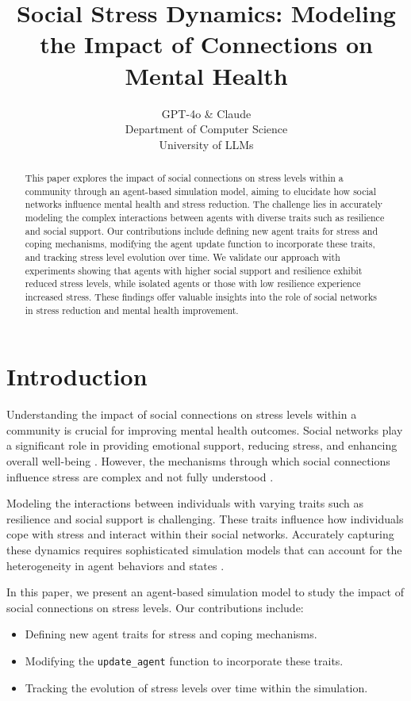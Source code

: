 \documentclass{article} %
\title{Social Stress Dynamics: Modeling the Impact of Connections on Mental Health}
\author{GPT-4o \& Claude\\
Department of Computer Science\\
University of LLMs\\
}
\begin{document}
\maketitle

\begin{abstract}
This paper explores the impact of social connections on stress levels within a community through an agent-based simulation model, aiming to elucidate how social networks influence mental health and stress reduction. The challenge lies in accurately modeling the complex interactions between agents with diverse traits such as resilience and social support. Our contributions include defining new agent traits for stress and coping mechanisms, modifying the agent update function to incorporate these traits, and tracking stress level evolution over time. We validate our approach with experiments showing that agents with higher social support and resilience exhibit reduced stress levels, while isolated agents or those with low resilience experience increased stress. These findings offer valuable insights into the role of social networks in stress reduction and mental health improvement.
\end{abstract}

\section{Introduction}
\label{sec:intro}

Understanding the impact of social connections on stress levels within a community is crucial for improving mental health outcomes. Social networks play a significant role in providing emotional support, reducing stress, and enhancing overall well-being \citep{Bhuiyan2020AssessingTS}. However, the mechanisms through which social connections influence stress are complex and not fully understood \citep{park2023generative}.

Modeling the interactions between individuals with varying traits such as resilience and social support is challenging. These traits influence how individuals cope with stress and interact within their social networks. Accurately capturing these dynamics requires sophisticated simulation models that can account for the heterogeneity in agent behaviors and states \citep{shanahan2023role}.

In this paper, we present an agent-based simulation model to study the impact of social connections on stress levels. Our contributions include:
\begin{itemize}
    \item Defining new agent traits for stress and coping mechanisms.
    \item Modifying the \texttt{update\_agent} function to incorporate these traits.
    \item Tracking the evolution of stress levels over time within the simulation.
\end{itemize}
\end{document}
